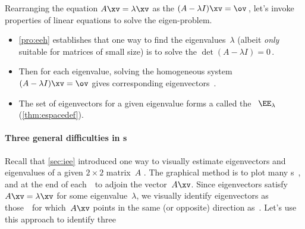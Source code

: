 Rearranging the equation \(A\xv=\lambda\xv\) as the   \((A-\lambda I)\xv=\ov\)\,, let's invoke properties of linear equations to solve the eigen-problem.
\begin{itemize}
\item \cref{pro:eeh} establishes that one way to find the eigenvalues~\(\lambda\) (albeit \emph{only} suitable for matrices of small size) is to solve the  \(\det(A-\lambda I)=0\)\,. 
\item Then for each eigenvalue, solving the homogeneous system \((A-\lambda I)\xv=\ov\) gives corresponding eigenvectors~\xv. 
\item The set of eigenvectors for a given eigenvalue forms a  called the ~\(\EE_\lambda\) (\cref{thm:espacedef}).

\end{itemize}






\paragraph{Three general difficulties in s}
Recall that \cref{sec:iee} introduced one way to visually estimate eigenvectors and eigenvalues of a given \(2\times2\) matrix~\(A\) \cite[]{Schonefeld1995}. 
The graphical method is to plot many s~\xv, and at the end of each~\xv\ to adjoin the vector~\(A\xv\).
Since eigenvectors satisfy \(A\xv=\lambda\xv\) for some  eigenvalue~\(\lambda\), we visually identify eigenvectors as those~\xv\ for which~\(A\xv\) points in the same (or opposite) direction as~\xv.
Let's use this approach to identify three 

